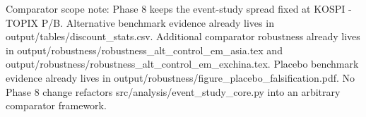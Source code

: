 Comparator scope note: Phase 8 keeps the event-study spread fixed at KOSPI - TOPIX P/B.
Alternative benchmark evidence already lives in output/tables/discount_stats.csv.
Additional comparator robustness already lives in output/robustness/robustness_alt_control_em_asia.tex and output/robustness/robustness_alt_control_em_exchina.tex.
Placebo benchmark evidence already lives in output/robustness/figure_placebo_falsification.pdf.
No Phase 8 change refactors src/analysis/event_study_core.py into an arbitrary comparator framework.
